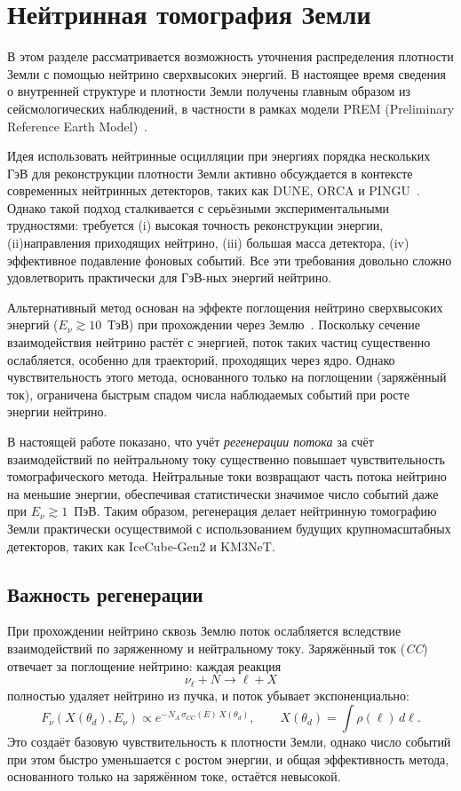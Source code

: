 \section{Нейтринная томография Земли}
\label{sec:tomography}
В этом разделе рассматривается возможность уточнения распределения плотности Земли с помощью нейтрино сверхвысоких энергий.  
В настоящее время сведения о внутренней структуре и плотности Земли получены главным образом из сейсмологических наблюдений, в частности в рамках модели PREM (Preliminary Reference Earth Model)~\cite{dziewonskiPREM1981}.

Идея использовать нейтринные осцилляции при энергиях порядка нескольких ГэВ для реконструкции плотности Земли активно обсуждается в контексте современных нейтринных детекторов, таких как DUNE, ORCA и PINGU~\cite{winterTomography2013,akhmedovTomography2006}.  
Однако такой подход сталкивается с серьёзными экспериментальными трудностями: требуется (i) высокая точность реконструкции энергии, (ii)направления приходящих нейтрино, (iii) большая масса детектора, (iv) эффективное подавление фоновых событий. Все эти требования  довольно сложно удовлетворить практически для ГэВ-ных энергий нейтрино.

Альтернативный метод основан на эффекте поглощения нейтрино сверхвысоких энергий ($E_\nu \gtrsim 10$~ТэВ) при прохождении через Землю~\cite{gandhiAbsorption1998,franceTomography2019}.  
Поскольку сечение взаимодействия нейтрино растёт с энергией, поток таких частиц существенно ослабляется, особенно для траекторий, проходящих через ядро.  
Однако чувствительность этого метода, основанного только на поглощении (заряжённый ток), ограничена быстрым спадом числа наблюдаемых событий при росте энергии нейтрино.

В настоящей работе показано, что учёт \emph{регенерации потока} за счёт взаимодействий по нейтральному току существенно повышает чувствительность томографического метода.  
Нейтральные токи возвращают часть потока нейтрино на меньшие энергии, обеспечивая статистически значимое число событий даже при $E_\nu \gtrsim 1$~ПэВ.  
Таким образом, регенерация делает нейтринную томографию Земли практически осуществимой с использованием будущих крупномасштабных детекторов, таких как IceCube-Gen2 и KM3NeT.

\subsection{Важность регенерации}

При прохождении нейтрино сквозь Землю поток ослабляется вследствие взаимодействий по заряженному и нейтральному току.  
Заряжённый ток (\textit{CC}) отвечает за поглощение нейтрино: каждая реакция
\[
\nu_\ell + N \to \ell + X
\]
полностью удаляет нейтрино из пучка, и поток убывает экспоненциально:
\[
F_\nu(X(\theta_d),E_\nu) \propto 
e^{-N_A\,\sigma_{CC}(E)\,X(\theta_d)}, 
\qquad
X(\theta_d) = \int \rho(\ell)\, d\ell .
\]
Это создаёт базовую чувствительность к плотности Земли, однако число событий при этом быстро уменьшается с ростом энергии, и общая эффективность метода, основанного только на заряжённом токе, остаётся невысокой.

